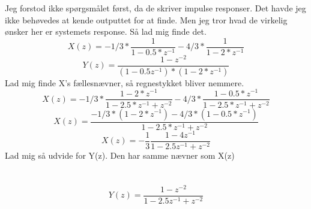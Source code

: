 \begin{Opgaver}
\begin{kapitel}[Z transformation]
\begin{Opgave}
            \begin{UnderOpgave}
                Jeg forstod ikke spørgsmålet først, da de skriver impulse responser. Det havde jeg ikke behøvedes at kende outputtet for at finde. Men jeg tror hvad de virkelig ønsker her er systemets response.
                Så lad mig finde det. \\
                \[X(z) = -1/3 * \frac{1}{1 - 0.5*z^{-1}} - 4/3 * \frac{1}{1 - 2*z^{-1}}\]
                \[Y(z) = \frac{1 - z^{-2}}{(1 - 0.5 z^{-1})*(1 - 2*z^{-1})}\]
                Lad mig finde X's fællesnævner, så regnestykket bliver nemmere. 
                \[X(z) = -1/3 * \frac{1 - 2*z^{-1}}{1 - 2.5*z^{-1} + z^{-2}} - 4/3 * \frac{1 - 0.5*z^{-1}}{1 - 2.5*z^{-1} + z^{-2}}\]
                \[X(z) = \frac{-1/3 *(1 - 2*z^{-1}) - 4/3*(1 - 0.5*z^{-1})}{1 - 2.5*z^{-1} + z^{-2}}\]
                \[X(z) = -\frac{1}{3}\frac{1 - 4z^{-1}}{1 - 2.5z^{-1} + z^{-2}}\]
                Lad mig så udvide for Y(z). Den har samme nævner som X(z) \\\\\\
                \[Y(z) = \frac{1 - z^{-2}}{1 - 2.5z^{-1} + z^{-2}}\]



\end{UnderOpgave}
\end{Opgave}
\end{kapitel}
\end{Opgaver}
